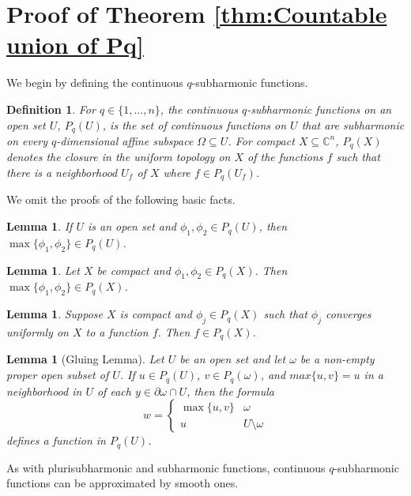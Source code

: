 \documentclass[12pt]{amsart}
\newtheorem{definition}[theorem]{Definition}
\newtheorem{lem}[theorem]{Lemma}
\numberwithin{equation}{section}
{\theoremstyle{definition}
\newtheorem{remark}[theorem]{Remark}
}
\begin{document}
\appendix

\section{Proof of Theorem \ref{thm:Countable union of Pq}}\label{Appendix section}

 We begin by defining the continuous $q$-subharmonic functions.

\begin{definition}
For $q \in \{1,\ldots, n\}$, the continuous $q$-subharmonic functions on an open set $U$, $P_q(U)$, is the set of continuous functions on $U$ that are subharmonic on every $q$-dimensional affine subspace $\Omega \subseteq U$.  For compact $X \subseteq \mathbb{C}^n$, $P_q(X)$ denotes the closure in the uniform topology on $X$ of the functions $f$ such that there is a neighborhood $U_f$ of $X$ where $f \in P_q(U_f)$.
\end{definition}

We omit the proofs of the following basic facts.
\begin{lem}\label{closed under maximums}
    If $U$ is an open set and $\phi_1, \phi_2 \in P_q(U)$, then $\max\{\phi_1, \phi_2\} \in P_q(U)$. 
\end{lem}
\begin{lem}\label{closed under maximums for X compact}
Let $X$ be compact and $\phi_1, \phi_2 \in P_q(X)$.  Then $\max\{\phi_1, \phi_2\} \in P_q(X)$.
\end{lem}

\begin{lem}\label{Pq(X) is a closed space}
Suppose $X$ is compact and $\phi_j \in P_q(X)$ such that $\phi_j$ converges uniformly on $X$ to a function $f$.  Then $f \in P_q(X)$.
\end{lem}

\begin{lem}[Gluing Lemma]\label{gluing lemma}
Let $U$ be an open set and let $\omega$ be a non-empty proper open subset of $U$.  If $u \in P_q(U)$, $v \in P_q(\omega)$, and $max\{u, v\} = u$ in a neighborhood in $U$ of each $y \in \partial \omega \cap U$, then the formula
$$
w = \begin{cases}
    \max\{u, v\} & \omega
    \\
    u & U\setminus\omega
\end{cases}
$$
defines a function in $P_q(U)$.
 \end{lem}

As with plurisubharmonic and subharmonic functions, continuous $q$-subharmonic functions can be approximated by smooth ones.
\end{document}
